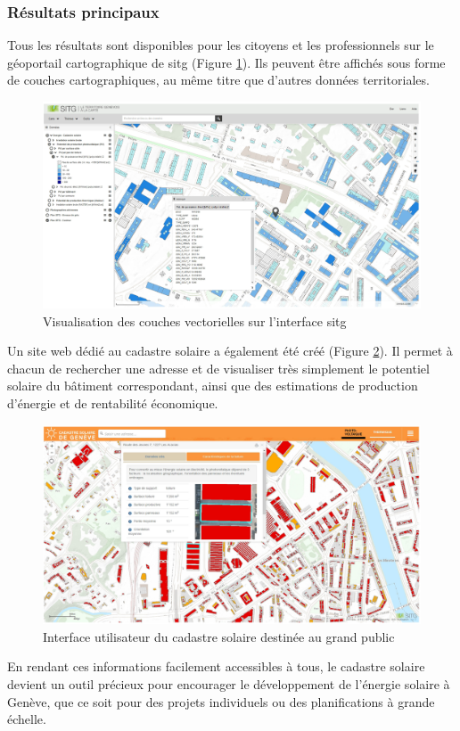 \subsubsection{Résultats principaux}
\par{Tous les résultats sont disponibles pour les citoyens et les professionnels sur le géoportail cartographique de \acrshort{sitg} (Figure \ref{fig:cadastre_solaire_couche_vec_sitg}). Ils peuvent être affichés sous forme de couches cartographiques, au même titre que
d'autres données territoriales.}
\begin{figure}[H]
    \centering
    \includegraphics[width=1\linewidth]{02-main//figures/ch2/cadastre_solaire_couche_vec_sitg.png}
    \caption{Visualisation des couches vectorielles sur l'interface \acrshort{sitg} \cite{desthieux_solar_2018}}
    \label{fig:cadastre_solaire_couche_vec_sitg}
\end{figure}
\par{Un site web dédié au cadastre solaire a également été créé (Figure \ref{fig:cadastre_solaire_sitg_labs}). Il permet à chacun de rechercher une adresse et de visualiser très simplement le potentiel solaire du bâtiment correspondant, ainsi que des estimations de production d'énergie et de rentabilité économique.}
\begin{figure}[H]
    \centering
    \includegraphics[width=1\linewidth]{02-main//figures/ch2/cadastre_solaire_sitg_labs.png}
    \caption{Interface utilisateur du cadastre solaire destinée au grand public \cite{desthieux_solar_2018}}
    \label{fig:cadastre_solaire_sitg_labs}
\end{figure}
\par{En rendant ces informations facilement accessibles à tous, le cadastre solaire devient un outil précieux pour encourager le développement de l'énergie solaire à Genève, que ce soit pour des projets individuels ou des planifications à grande échelle.}

